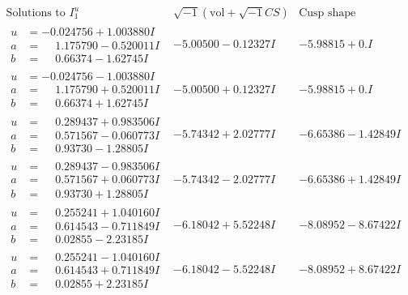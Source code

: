 \documentclass[1p]{elsarticle_modified}
\theoremstyle{definition}
\newcommand{\I}{\sqrt{-1}}
\begin{document}
$$\begin{array}{c|c|c}  
\text{Solutions to }I^u_{1}& \I (\text{vol} + \sqrt{-1}CS) & \text{Cusp shape}\\
 \hline 
\begin{aligned}
u &= -0.024756 + 1.003880 I \\
a &= \phantom{-}1.175790 - 0.520011 I \\
b &= \phantom{-}0.66374 - 1.62745 I\end{aligned}
 & -5.00500 - 0.12327 I & -5.98815 + 0. I\phantom{ +0.000000I} \\ \hline\begin{aligned}
u &= -0.024756 - 1.003880 I \\
a &= \phantom{-}1.175790 + 0.520011 I \\
b &= \phantom{-}0.66374 + 1.62745 I\end{aligned}
 & -5.00500 + 0.12327 I & -5.98815 + 0. I\phantom{ +0.000000I} \\ \hline\begin{aligned}
u &= \phantom{-}0.289437 + 0.983506 I \\
a &= \phantom{-}0.571567 - 0.060773 I \\
b &= \phantom{-}0.93730 - 1.28805 I\end{aligned}
 & -5.74342 + 2.02777 I & -6.65386 - 1.42849 I \\ \hline\begin{aligned}
u &= \phantom{-}0.289437 - 0.983506 I \\
a &= \phantom{-}0.571567 + 0.060773 I \\
b &= \phantom{-}0.93730 + 1.28805 I\end{aligned}
 & -5.74342 - 2.02777 I & -6.65386 + 1.42849 I \\ \hline\begin{aligned}
u &= \phantom{-}0.255241 + 1.040160 I \\
a &= \phantom{-}0.614543 - 0.711849 I \\
b &= \phantom{-}0.02855 - 2.23185 I\end{aligned}
 & -6.18042 + 5.52248 I & -8.08952 - 8.67422 I \\ \hline\begin{aligned}
u &= \phantom{-}0.255241 - 1.040160 I \\
a &= \phantom{-}0.614543 + 0.711849 I \\
b &= \phantom{-}0.02855 + 2.23185 I\end{aligned}
 & -6.18042 - 5.52248 I & -8.08952 + 8.67422 I \\ \hline\begin{aligned}

\end{aligned}
\end{array}$$
\end{document}
